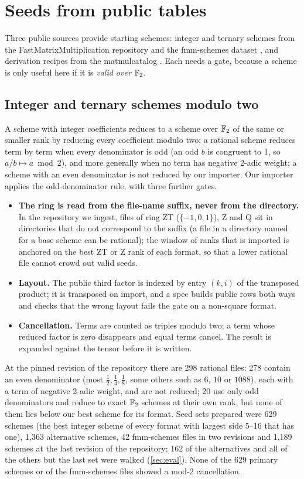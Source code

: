 \section{Seeds from public tables}\label{sec:seeds}

Three public sources provide starting schemes: integer and ternary schemes from the FastMatrixMultiplication repository \cite{perminov2026fmmrepo} and the fmm-schemes dataset \cite{witteveen2026schemes},
and derivation recipes from the matmulcatalog \cite{lacelle2026catalog}. Each needs a gate, because a scheme is only useful here if it is \emph{valid over ${\mathbb{F}_2}$}.

\subsection{Integer and ternary schemes modulo two}
A scheme with integer coefficients reduces to a scheme over ${\mathbb{F}_2}$ of the same or smaller rank by reducing every coefficient modulo two; a rational scheme reduces term by term when every denominator is odd (an odd $b$ is congruent to 1, so $a/b\mapsto a\bmod2$), and more generally when no term has negative 2-adic weight; a scheme with an even denominator is not reduced by our importer.
Our importer applies the odd-denominator rule, with three further gates.
\begin{itemize}
\item \textbf{The ring is read from the file-name suffix, never from the directory.} In the repository we ingest, files of ring ZT ($\{-1,0,1\}$), Z and Q sit in directories that do not correspond to the suffix (a file in a directory named for a base scheme can be rational); the window of ranks
that is imported is anchored on the best ZT or Z rank of each format, so that a lower rational file cannot crowd out valid seeds.
\item \textbf{Layout.} The public third factor is indexed by entry $(k,i)$ of the transposed product; it is transposed on import, and a spec builds public rows both ways and checks that the wrong layout fails the gate on a non-square format.
\item \textbf{Cancellation.} Terms are counted as triples modulo two; a term whose reduced factor is zero disappears and equal terms cancel. The result is expanded against the tensor before it is written.
\end{itemize}
At the pinned revision of the repository there are 298 rational files: 278 contain an even denominator (most $\tfrac12,\tfrac14,\tfrac18$, some others such as $6$, $10$ or $1088$), each with a term of negative 2-adic weight, and are not reduced; 20 use only odd denominators and reduce to exact ${\mathbb{F}_2}$ schemes at their own rank, but none of them lies below our best scheme for its format.
Seed sets prepared were 629 schemes (the best integer scheme of every format with largest side 5--16 that has one), 1{,}363 alternative schemes, 42 fmm-schemes files in two revisions and 1{,}189 schemes at the last revision of the repository; 162 of the alternatives and all of the others but the last set were walked (\cref{sec:eval}).
None of the 629 primary schemes or of the fmm-schemes files showed a mod-2 cancellation.

